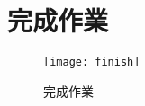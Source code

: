 \chapter{完成作業}
\begin{figure}[hbt!]
\begin{center}
\texttt{[image: finish]}
\caption{\Large 完成作業}
\label{完成作業}
\end{center}
\end{figure}